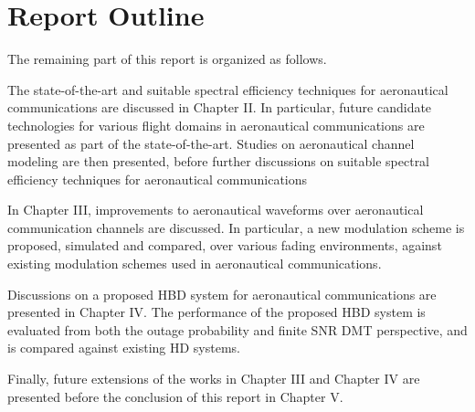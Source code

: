 \section{Report Outline}

The remaining part of this report is organized as follows.

The state-of-the-art and suitable spectral efficiency techniques for aeronautical communications are discussed in Chapter II. In particular, future candidate technologies for various flight domains in aeronautical communications are presented as part of the state-of-the-art. Studies on aeronautical channel modeling are then presented, before further discussions on suitable spectral efficiency techniques for aeronautical communications 

In Chapter III, improvements to aeronautical waveforms over aeronautical communication channels are discussed. In particular, a new modulation scheme is proposed, simulated and compared, over various fading environments, against existing modulation schemes used in aeronautical communications.

Discussions on a proposed HBD system for aeronautical communications are presented in Chapter IV. The performance of the proposed HBD system is evaluated from both the outage probability and finite SNR DMT perspective, and is compared against existing HD systems.

Finally, future extensions of the works in Chapter III and Chapter IV are presented before the conclusion of this report in Chapter V.

%
%
%
%
%
%
%

